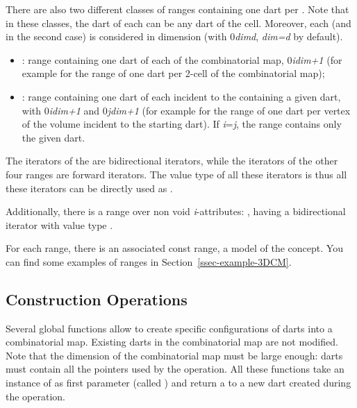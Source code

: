 There are also two different classes of ranges containing one dart per
. Note that in these classes, the dart of each  can
be any dart of the cell. Moreover, each  (and  in the
second case) is considered in dimension  (with 
0\myleq{}\emph{dim}\myleq{}\emph{d}, \emph{dim=d} by default).
\begin{itemize}
\item {}: range containing one dart of
  each  of the combinatorial map, 0\myleq{}\emph{i}\myleq{}\emph{dim+1} (for
  example  for the range of one dart per
  2-cell of the combinatorial map);
\item {}: range
  containing one dart of each  incident to the 
  containing a given dart, with 0\myleq{}\emph{i}\myleq{}\emph{dim+1} and 
  0\myleq{}\emph{j}\myleq{}\emph{dim+1} (for example
   for the range of
  one dart per vertex of the volume incident to the starting dart).
  If \emph{i}=\emph{j}, the range contains only the given dart.
\end{itemize}

The iterators of the  are bidirectional iterators, 
while the iterators of the other four ranges are forward iterators. 
The value type of all these iterators is  thus all these 
iterators can be directly used as .

Additionally, there is a range over non void \emph{i}-attributes:
, having a bidirectional iterator with
value type .

For each range, there is an associated const range, a model of the
 concept.  You can find some examples of ranges in
Section~\ref{ssec-example-3DCM}.

\subsection{Construction Operations}\label{ssec-construction}

Several global functions allow to create specific configurations of
darts into a combinatorial map. Existing darts in the combinatorial
map are not modified. Note that the dimension of the combinatorial map
must be large enough: darts must contain all the \betats{} pointers used by the
operation. All these functions take an instance of
 as first parameter (called ) and return
a  to a new dart created during the operation.

